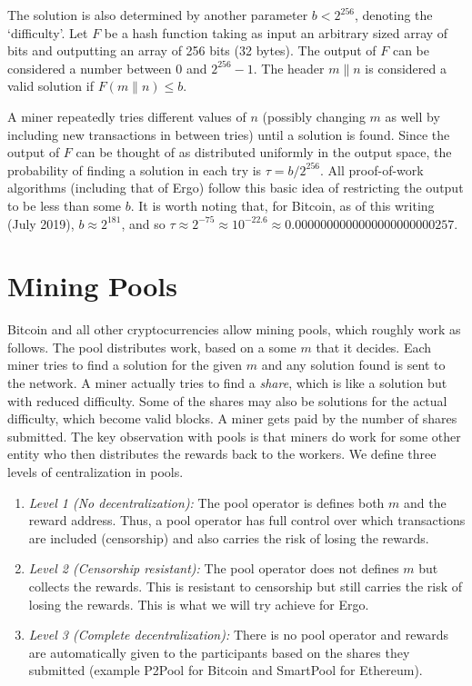 \documentclass[runningheads]{llncs}
\begin{document}
The solution is also determined by another parameter $b < 2^{256}$, denoting the `difficulty'. Let $F$ be a hash function taking as input an arbitrary sized array of bits and outputting an array of 256 bits (32 bytes). The output of $F$ can be considered a number between 0 and $2^{256}-1$. The header $m\|n$ is considered a valid solution if $F(m\|n) \leq b$. 

A miner repeatedly tries different values of $n$ (possibly changing $m$ as well by including new transactions in between tries) until a solution is found. Since the output of $F$ can be thought of as distributed uniformly in the output space, the probability of finding a solution in each try is $\tau = b/2^{256}$. All proof-of-work algorithms (including that of Ergo) follow this basic idea of restricting the output to be less than some $b$. It is worth noting that, for Bitcoin, as of this writing (July 2019), $b\approx 2^{181}$, and so $\tau \approx 2^{-75}\approx 10^{-22.6}\approx 0.0000000000000000000000257$.

\section{Mining Pools}

Bitcoin and all other cryptocurrencies allow mining pools, which roughly work as follows. The pool distributes work, based on a some $m$ that it decides. Each miner tries to find a solution for the given $m$ and any solution found is sent to the network. 
A miner actually tries to find a {\em share}, which is like a solution but with reduced difficulty. Some of the shares may also be solutions for the actual difficulty, which become valid blocks. A miner gets paid by the number of shares submitted.
The key observation with pools is that miners do work for some other entity who then distributes the rewards back to the workers.
We define three levels of centralization in pools. 

\begin{enumerate}
	\item {\em Level 1 (No decentralization):} The pool operator is defines both $m$ and the reward address. Thus, a pool operator has full control over which transactions are included (censorship) and also carries the risk of losing the rewards.
	\item {\em Level 2 (Censorship resistant):} The pool operator does not defines $m$ but collects the rewards. This is resistant to censorship but still carries the risk of losing the rewards. This is what we will try achieve for Ergo. 
	\item {\em Level 3 (Complete decentralization):} There is no pool operator and rewards are automatically given to the participants based on the shares they submitted (example P2Pool for Bitcoin and SmartPool for Ethereum).
\end{enumerate}
\end{document}
